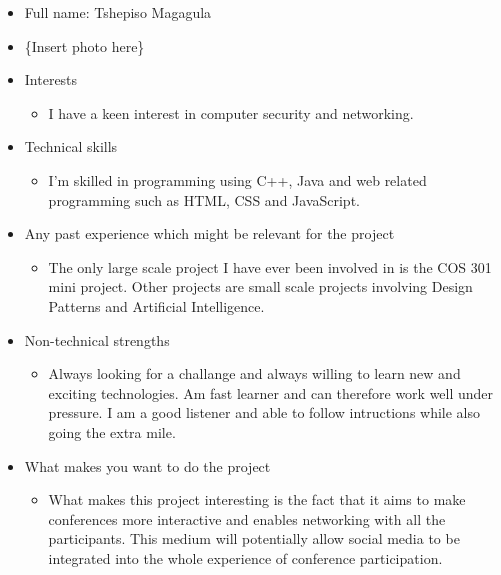 
\begin{itemize}
	\item Full name: Tshepiso Magagula
	\item \{Insert photo here\}
	\item Interests
		\begin{itemize}
			\item I have a keen interest in computer security and networking.
		\end{itemize}
	\item Technical skills
		\begin{itemize}
			\item I'm skilled in programming using C++, Java and web related 
			programming such as HTML, CSS and JavaScript.
		\end{itemize}
	\item Any past experience which might be relevant for the project
		\begin{itemize}
			\item The only large scale project I have ever been involved in is the COS 301 mini project. Other projects are small scale projects involving 			Design Patterns and Artificial Intelligence.
		\end{itemize}
	\item Non-technical strengths
		\begin{itemize}
			\item Always looking for a challange and always willing to learn new 
			and exciting technologies. Am fast learner and can therefore work well under pressure. I am
			 a good listener and able to follow intructions while also going the extra mile. 
		\end{itemize}
	\item What makes you want to do the project
		\begin{itemize}
			\item What makes this project interesting is the fact that it aims to make conferences
			more interactive and enables networking with all the participants. This medium will potentially
			allow social media to be integrated into the whole experience of conference
			participation.
		\end{itemize}



\end{itemize}
